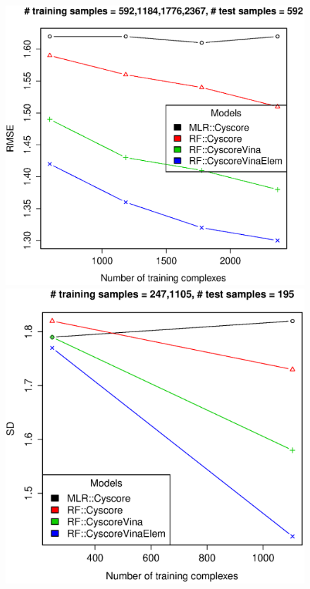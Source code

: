 \documentclass[journal=jacsat,manuscript=article]{achemso}
\begin{document}
\begin{figure}[ht!]
\endminipage
{}
\includegraphics[width=\linewidth]{../rfcyscore/tst-592-rmse.eps}
\endminipage
\\
\includegraphics[width=\linewidth]{../rfcyscore/tst-195-sdev.eps}
\endminipage

\end{figure}
\end{document}
